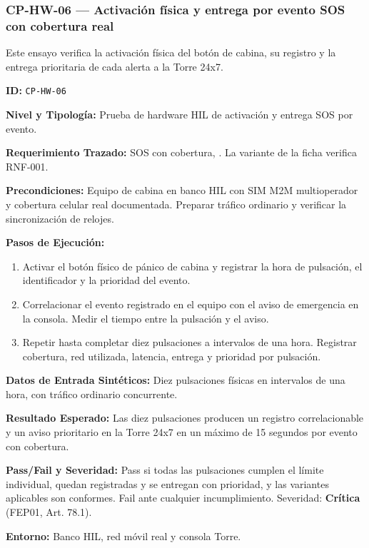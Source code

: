 \subsubsection*{CP-HW-06 — Activación física y entrega por evento SOS con cobertura real}\label{sec:9-cp-hw-06}
Este ensayo verifica la activación física del botón de cabina, su registro y la entrega prioritaria de cada alerta a la Torre 24x7.

\par\noindent\textbf{ID:} \texttt{CP-\allowbreak{}HW-\allowbreak{}06}\par
\par\noindent\textbf{Nivel y Tipología:} Prueba de hardware HIL de activación y entrega SOS por evento.\par
\par\noindent\textbf{Requerimiento Trazado:} SOS con cobertura, . La variante de la ficha verifica RNF-001.\par
\par\noindent\textbf{Precondiciones:} Equipo de cabina en banco HIL con SIM M2M multioperador y cobertura celular real documentada. Preparar tráfico ordinario y verificar la sincronización de relojes.\par
\par\noindent\textbf{Pasos de Ejecución:}\par
\begin{enumerate}
\item Activar el botón físico de pánico de cabina y registrar la hora de pulsación, el identificador y la prioridad del evento.
\item Correlacionar el evento registrado en el equipo con el aviso de emergencia en la consola. Medir el tiempo entre la pulsación y el aviso.
\item Repetir hasta completar diez pulsaciones a intervalos de una hora. Registrar cobertura, red utilizada, latencia, entrega y prioridad por pulsación.
\end{enumerate}
\par\noindent\textbf{Datos de Entrada Sintéticos:} Diez pulsaciones físicas en intervalos de una hora, con tráfico ordinario concurrente.\par
\par\noindent\textbf{Resultado Esperado:} Las diez pulsaciones producen un registro correlacionable y un aviso prioritario en la Torre 24x7 en un máximo de 15 segundos por evento con cobertura.\par
\par\noindent\textbf{Pass/Fail y Severidad:} Pass si todas las pulsaciones cumplen el límite individual, quedan registradas y se entregan con prioridad, y las variantes aplicables son conformes. Fail ante cualquier incumplimiento. Severidad: \textbf{Crítica} (FEP01, Art. 78.1).\par
\par\noindent\textbf{Entorno:} Banco HIL, red móvil real y consola Torre.\par

